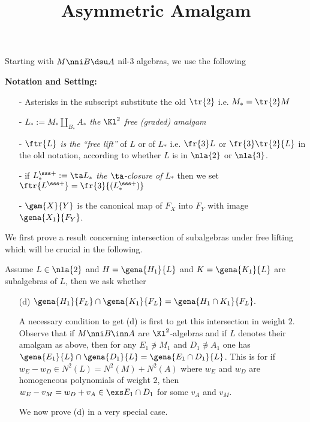 \documentclass[a4paper,11pt,german,english]{article}
\title{Asymmetric Amalgam}
\begin{document}
\maketitle\noindent
Starting with $M\nni B\dsu A$ nil-$3$ algebras, we use the following

\smallskip
{\bf Notation and Setting:}
\begin{itemize}
\item[-]Asterisks in the subscript substitute the old $\tr{2}$ i.e. $M_{\ast}=\tr{2}M$
\item[-]$L_{*}:=M_{*}\amalg_{B_{*}}A_{*}$ {\em the $\Kl^{2}$ free (graded) amalgam}
\item[-]$\ftr{L}$ {\em is the ``free lift''} of $L$ or of $L_{*}$ i.e. $\fr{3}L$ or $\fr{3}\tr{2}{L}$ in the old notation, according to whether $L$ is in $\nla{2}$ or $\nla{3}$.
\item[-]if $L_{*}^{\sss +}:=\ta L_{*}$ {\em the $\ta$-closure of $L_{*}$} then we set $\ftr{L^{\sss +}}=\fr{3}{(L_{*}^{\sss +})}$
\item[-]$\gam{X}{Y}$ is the canonical map of $F_{X}$ into $F_{Y}$ with image $\gena{X_{1}}
{F_{Y}}$.
\end{itemize}

\medskip
We first prove a result concerning intersection of subalgebras under free lifting
which will be crucial in the following.

Assume $L\in\nla{2}$ and $H=\gena{H_{1}}{L}$ and
$K=\gena{K_{1}}{L}$ are subalgebras of $L$,
then we ask whether
\begin{itemize}
\item[(d)]\quad\quad$\gena{H_{1}}{F_{L}}\cap\gena{K_{1}}{F_{L}}=\gena{H_{1}\cap K_{1}}{F_{L}}.$

A necessary condition to get (d) is first to get this intersection in weight $2$. Observe
that if $M\nni B\inn A$ are $\Kl^{2}$-algebras and if $L$ denotes their amalgam as above,
then for any $E_{1}\nni M_{1}$ and $D_{1}\nni A_{1}$ one has $\gena{E_{1}}{L}\cap\gena{D_{1}}{L}=\gena{E_{1}\cap D_{1}}{L}$. This is for if $w_{E}-w_{D}\in N^{2}(L)=N^{2}(M)+N^{2}(A)$ where $w_{E}$ and $w_{D}$ are homogeneous polynomials of weight $2$, then $w_{E}-v_{M}=w_{D}+v_{A}\in\exs E_{1}\cap D_{1}$ for some $v_{A}$ and $v_{M}$.

We now prove (d) in a very special case.
\end{itemize}
\end{document}
